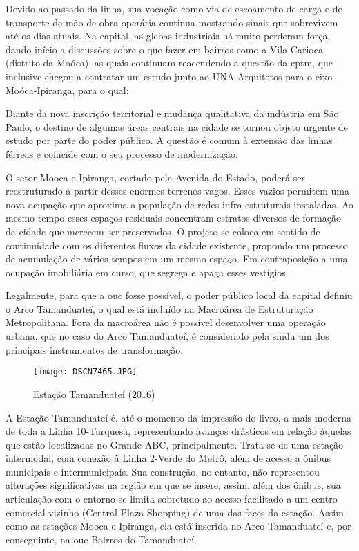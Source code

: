 \documentclass[11pt,fleqn]{book} %
\begin{document}
Devido ao passado da linha, sua vocação como via de escoamento de carga e de transporte de mão de obra operária continua mostrando sinais que sobrevivem até os dias atuais. Na capital, as glebas industriais há muito perderam força, dando início a discussões sobre o que fazer em bairros como a Vila Carioca (distrito da Moóca), as quais continuam reacendendo a questão da \gls{cptm}, que inclusive chegou a contratar um estudo junto ao UNA Arquitetos para o eixo Moóca-Ipiranga, para o qual:

\begin{citacao}
	Diante da nova inscrição territorial e mudança qualitativa da indústria em São Paulo, o destino de algumas áreas centrais na cidade se tornou objeto urgente de estudo por parte do poder público. A questão é comum à extensão das linhas férreas e coincide com o seu processo de modernização.
	
	O setor Mooca e Ipiranga, cortado pela Avenida do Estado, poderá ser reestruturado a partir desses enormes terrenos vagos. Esses vazios permitem uma nova ocupação que aproxima a população de redes infra-estruturais instaladas. Ao mesmo tempo esses espaços residuais concentram estratos diversos de formação da cidade que merecem ser preservados. O projeto se coloca em sentido de continuidade com os diferentes fluxos da cidade existente, propondo um processo de acumulação de vários tempos em um mesmo espaço. Em contraposição a uma ocupação imobiliária em curso, que segrega e apaga esses vestígios.
	\cite{unaarq}
\end{citacao}

Legalmente, para que a \gls{ouc} fosse possível, o poder público local da capital definiu o Arco Tamanduateí, o qual está incluído na Macroárea de Estruturação Metropolitana. Fora da macroárea não é possível desenvolver uma operação urbana, que no caso do Arco Tamanduateí, é considerado pela \gls{smdu} um dos principais instrumentos de transformação\cite{smdumacro}.

\begin{figure}[h]
	\caption{Estação Tamanduateí (2016)}
	\texttt{[image: DSCN7465.JPG]}
\end{figure}

A Estação Tamanduateí é, até o momento da impressão do livro, a mais moderna de toda a Linha 10-Turquesa, representando avanços drásticos em relação àquelas que estão localizadas no Grande ABC, principalmente. Trata-se de uma estação intermodal, com conexão à Linha 2-Verde do Metrô, além de acesso a ônibus municipais e intermunicipais. Sua construção, no entanto, não representou alterações significativas na região em que se insere, assim, além dos ônibus, sua articulação com o entorno se limita sobretudo ao acesso facilitado a um centro comercial vizinho (Central Plaza Shopping) de uma das faces da estação. Assim como as estações Mooca e Ipiranga, ela está inserida no Arco Tamanduateí e, por conseguinte, na \gls{ouc} Bairros do Tamanduateí.
\end{document}
